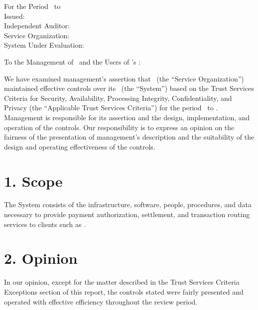\documentclass[11pt]{article}
\begin{document}

\begin{center}
For the Period \AuditPeriodStart\ to \AuditPeriodEnd \\
Issued: \SOCReportDate \\[0.5em]
Independent Auditor: \AuditFirm \\
Service Organization: \VendorName \\
System Under Evaluation: \SystemName
\end{center}

\vspace{1em}
To the Management of \VendorName\ and the Users of \VendorName's \SystemName:

We have examined management's assertion that \VendorName\ (the ``Service Organization'')
maintained effective controls over its \SystemName\ (the ``System'') based on the Trust
Services Criteria for Security, Availability, Processing Integrity, Confidentiality, and
Privacy (the ``Applicable Trust Services Criteria'') for the period \AuditPeriodStart\ to
\AuditPeriodEnd. Management is responsible for its assertion and the design, implementation,
and operation of the controls. Our responsibility is to express an opinion on the fairness of
the presentation of management's description and the suitability of the design and operating
effectiveness of the controls.

\section*{1. Scope}
The System consists of the infrastructure, software, people, procedures, and data necessary
to provide payment authorization, settlement, and transaction routing services to clients
such as \ClientName.

\section*{2. Opinion}
In our opinion, except for the matter described in the Trust Services Criteria Exceptions
section of this report, the controls stated were fairly presented and operated with
effective efficiency throughout the review period.
\end{document}
